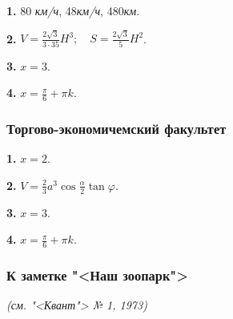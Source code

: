 \documentclass[a4paper, 14pt]{article}
\begin{document}
    \begin{onehalfspace}
    \textbf{1. } 80 \textit{км/ч}, 48\textit{км/ч}, 480\textit{км}.\par
    \textbf{2. } \(V=\frac{2\sqrt{3}}{3\cdot35}H^3; \quad S=\frac{2\sqrt{3}}{5}H^2\).\par
    \textbf{3. } \(x=3\).\par
    \textbf{4. } \(x=\frac{\pi}{6} + \pi k\).\par
    \end{onehalfspace}\par
    \begin{center}
    \subsubsection*{Торгово-экономичемский факультет}
    \end{center}\par
    \begin{onehalfspace}
    \textbf{1. } \(x=2\).\par
    \textbf{2. } \(V=\frac{2}{3}a^3\cos{\frac{\alpha}{2}}\tan{\varphi}\).\par
    \textbf{3. } \(x=3\).\par
    \textbf{4. } \(x=\frac{\pi}{6} + \pi k\).\par
    \end{onehalfspace}
    \begin{flushleft}
    \subsubsection*{К заметке "<Наш зоопарк">}
    \end{flushleft}\par
    \begin{center}
    \textit{(см. "<Квант"> № 1, 1973)}
    \end{center}
\end{document}
